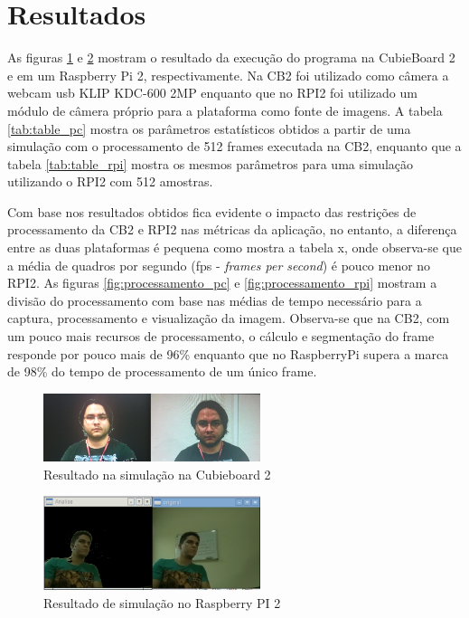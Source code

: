 \documentclass[conference]{IEEEtran}
\begin{document}


\section{Resultados}
As figuras \ref{fig:sim_pc} e \ref{fig:sim_rpi} mostram o resultado da execução do programa na CubieBoard 2 e em um Raspberry Pi 2, respectivamente. Na CB2 foi utilizado como câmera a webcam usb KLIP KDC-600 2MP enquanto que no RPI2 foi utilizado um módulo de câmera próprio para a plataforma como fonte de imagens. A tabela \ref{tab:table_pc} mostra os parâmetros estatísticos obtidos a partir de uma simulação com o processamento de 512 frames executada na CB2, enquanto que  a tabela \ref{tab:table_rpi} mostra os mesmos parâmetros para uma simulação utilizando o RPI2 com 512 amostras.

Com base nos resultados obtidos fica evidente o impacto das restrições de processamento da CB2 e RPI2 nas métricas da aplicação, no entanto, a diferença entre as duas plataformas é pequena como mostra a tabela x, onde observa-se que a média de quadros por segundo (fps - \textit{frames per second}) é pouco menor no RPI2. As figuras \ref{fig:processamento_pc} e \ref{fig:processamento_rpi} mostram a divisão do processamento com base nas médias de tempo necessário para a captura, processamento e visualização da imagem. Observa-se que na CB2, com um pouco mais recursos de processamento, o cálculo e segmentação do frame responde por pouco mais de 96\% enquanto que no RaspberryPi supera a marca de 98\% do tempo de processamento de um único frame.

\begin{figure}[!t]
\centering
\includegraphics[width=2.5in]{resultado_cb2}
\caption{Resultado na simulação na Cubieboard 2}
\label{fig:sim_pc}
\end{figure}

\begin{figure}[!t]
\centering
\includegraphics[width=2.5in]{Screen_RPI_01}
\caption{Resultado de simulação no Raspberry PI 2}
\label{fig:sim_rpi}
\end{figure}
\end{document}

